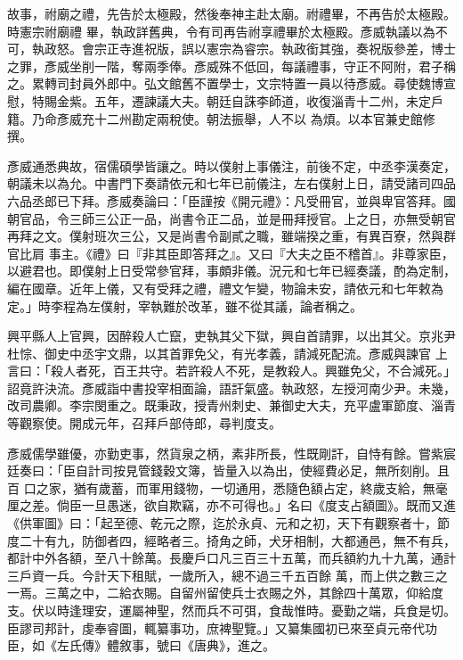 \begin{pinyinscope}
 故事，祔廟之禮，先告於太極殿，然後奉神主赴太廟。祔禮畢，不再告於太極殿。時憲宗祔廟禮
 畢，執政詳舊典，令有司再告祔享禮畢於太極殿。彥威執議以為不可，執政怒。會宗正寺進祝版，誤以憲宗為睿宗。執政銜其強，奏祝版參差，博士之罪，彥威坐削一階，奪兩季俸。彥威殊不低回，每議禮事，守正不阿附，君子稱之。累轉司封員外郎中。弘文館舊不置學士，文宗特置一員以待彥威。尋使魏博宣慰，特賜金紫。五年，遷諫議大夫。朝廷自誅李師道，收復淄青十二州，未定戶籍。乃命彥威充十二州勘定兩稅使。朝法振舉，人不以
 為煩。以本官兼史館修撰。



 彥威通悉典故，宿儒碩學皆讓之。時以僕射上事儀注，前後不定，中丞李漢奏定，朝議未以為允。中書門下奏請依元和七年已前儀注，左右僕射上日，請受諸司四品六品丞郎已下拜。彥威奏論曰：「臣謹按《開元禮》：凡受冊官，並與卑官答拜。國朝官品，令三師三公正一品，尚書令正二品，並是冊拜授官。上之日，亦無受朝官再拜之文。僕射班次三公，又是尚書令副貳之職，雖端揆之重，有異百寮，然與群官比肩
 事主。《禮》曰『非其臣即答拜之』。又曰『大夫之臣不稽首』。非尊家臣，以避君也。即僕射上日受常參官拜，事頗非儀。況元和七年已經奏議，酌為定制，編在國章。近年上儀，又有受拜之禮，禮文乍變，物論未安，請依元和七年敕為定。」時李程為左僕射，宰執難於改革，雖不從其議，論者稱之。



 興平縣人上官興，因醉殺人亡竄，吏執其父下獄，興自首請罪，以出其父。京兆尹杜悰、御史中丞宇文鼎，以其首罪免父，有光孝義，請減死配流。彥威與諫官
 上言曰：「殺人者死，百王共守。若許殺人不死，是教殺人。興雖免父，不合減死。」詔竟許決流。彥威詣中書投宰相面論，語訐氣盛。執政怒，左授河南少尹。未幾，改司農卿。李宗閔重之。既秉政，授青州刺史、兼御史大夫，充平盧軍節度、淄青等觀察使。開成元年，召拜戶部侍郎，尋判度支。



 彥威儒學雖優，亦勤吏事，然貨泉之柄，素非所長，性既剛訐，自恃有餘。嘗紫宸廷奏曰：「臣自計司按見管錢穀文簿，皆量入以為出，使經費必足，無所刻削。且百
 口之家，猶有歲蓄，而軍用錢物，一切通用，悉隨色額占定，終歲支給，無毫厘之差。倘臣一旦愚迷，欲自欺竊，亦不可得也。」名曰《度支占額圖》。既而又進《供軍圖》曰：「起至德、乾元之際，迄於永貞、元和之初，天下有觀察者十，節度二十有九，防御者四，經略者三。掎角之師，犬牙相制，大都通邑，無不有兵，都計中外各額，至八十餘萬。長慶戶口凡三百三十五萬，而兵額約九十九萬，通計三戶資一兵。今計天下租賦，一歲所入，總不過三千五百餘
 萬，而上供之數三之一焉。三萬之中，二給衣賜。自留州留使兵士衣賜之外，其餘四十萬眾，仰給度支。伏以時逢理安，運屬神聖，然而兵不可弭，食哉惟時。憂勤之端，兵食是切。臣謬司邦計，虔奉睿圖，輒纂事功，庶裨聖覽。」又纂集國初已來至貞元帝代功臣，如《左氏傳》體敘事，號曰《唐典》，進之。




\end{pinyinscope}
